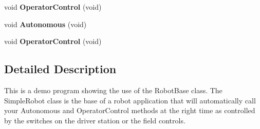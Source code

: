 \begin{DoxyCompactItemize}
\item 
\hypertarget{class_robot_demo_aea3d3a6789fa41653464bddc48d6a2c1}{void {\bfseries Operator\-Control} (void)}\label{class_robot_demo_aea3d3a6789fa41653464bddc48d6a2c1}

\item 
\hypertarget{class_robot_demo_a80f9c6496e671ca2145d7f5543985e9a}{void {\bfseries Autonomous} (void)}\label{class_robot_demo_a80f9c6496e671ca2145d7f5543985e9a}

\item 
\hypertarget{class_robot_demo_aea3d3a6789fa41653464bddc48d6a2c1}{void {\bfseries Operator\-Control} (void)}\label{class_robot_demo_aea3d3a6789fa41653464bddc48d6a2c1}

\end{DoxyCompactItemize}


\subsection{Detailed Description}
This is a demo program showing the use of the Robot\-Base class. The Simple\-Robot class is the base of a robot application that will automatically call your Autonomous and Operator\-Control methods at the right time as controlled by the switches on the driver station or the field controls. 

